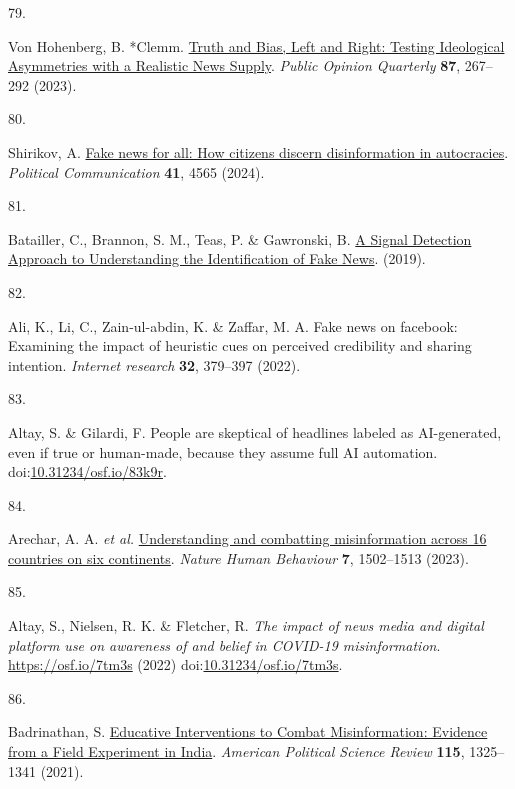\documentclass[
  man]{apa6}
\newlength{\cslhangindent}
\newlength{\csllabelwidth}
\newenvironment{CSLReferences}[2] %
 {\begin{list}{}{%
  \setlength{\itemindent}{0pt}
  \setlength{\leftmargin}{0pt}
  \setlength{\parsep}{0pt}
  \ifodd #1
   \setlength{\leftmargin}{\cslhangindent}
   \setlength{\itemindent}{-1\cslhangindent}
  \fi
  \setlength{\itemsep}{#2\baselineskip}}}
 {\end{list}}
\newcommand{\CSLLeftMargin}[1]{\parbox[t]{\csllabelwidth}{\strut#1\strut}}
\newcommand{\CSLRightInline}[1]{\parbox[t]{\linewidth - \csllabelwidth}{\strut#1\strut}}
\begin{document}
\begin{CSLReferences}{0}{0}
\CSLLeftMargin{79. }%
\CSLRightInline{Von Hohenberg, B. *Clemm. \href{https://doi.org/10.1093/poq/nfad013}{Truth and Bias, Left and Right: Testing Ideological Asymmetries with a Realistic News Supply}. \emph{Public Opinion Quarterly} \textbf{87}, 267--292 (2023).}

\CSLLeftMargin{80. }%
\CSLRightInline{*Shirikov, A. \href{https://doi.org/10.1080/10584609.2023.2257618}{Fake news for all: How citizens discern disinformation in autocracies}. \emph{Political Communication} \textbf{41}, 4565 (2024).}

\CSLLeftMargin{81. }%
\CSLRightInline{Batailler, C., Brannon, S. M., Teas, P. \& Gawronski, B. \href{https://osf.io/uc9me/}{A Signal Detection Approach to Understanding the Identification of Fake News}. (2019).}

\CSLLeftMargin{82. }%
\CSLRightInline{*Ali, K., Li, C., Zain-ul-abdin, K. \& Zaffar, M. A. Fake news on facebook: Examining the impact of heuristic cues on perceived credibility and sharing intention. \emph{Internet research} \textbf{32}, 379--397 (2022).}

\CSLLeftMargin{83. }%
\CSLRightInline{*Altay, S. \& Gilardi, F. People are skeptical of headlines labeled as AI-generated, even if true or human-made, because they assume full AI automation. doi:\href{https://doi.org/10.31234/osf.io/83k9r}{10.31234/osf.io/83k9r}.}

\CSLLeftMargin{84. }%
\CSLRightInline{*Arechar, A. A. \emph{et al.} \href{https://doi.org/10.1038/s41562-023-01641-6}{Understanding and combatting misinformation across 16 countries on six continents}. \emph{Nature Human Behaviour} \textbf{7}, 1502--1513 (2023).}

\CSLLeftMargin{85. }%
\CSLRightInline{*Altay, S., Nielsen, R. K. \& Fletcher, R. \emph{The impact of news media and digital platform use on awareness of and belief in COVID-19 misinformation}. \url{https://osf.io/7tm3s} (2022) doi:\href{https://doi.org/10.31234/osf.io/7tm3s}{10.31234/osf.io/7tm3s}.}

\CSLLeftMargin{86. }%
\CSLRightInline{*Badrinathan, S. \href{https://doi.org/10.1017/S0003055421000459}{Educative Interventions to Combat Misinformation: Evidence from a Field Experiment in India}. \emph{American Political Science Review} \textbf{115}, 1325--1341 (2021).}


\end{CSLReferences}
\end{document}
